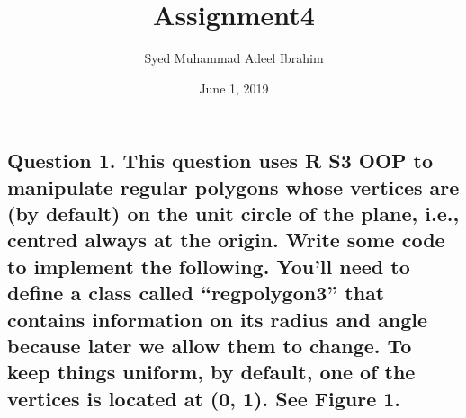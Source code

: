 \documentclass[]{article}
\title{Assignment4}
\author{Syed Muhammad Adeel Ibrahim}
\date{June 1, 2019}
\begin{document}
\maketitle

\subsection{\texorpdfstring{Question 1. This question uses R S3 OOP to
manipulate regular polygons whose vertices are (by default) on the unit
circle of the plane, i.e., centred always at the origin. Write some code
to implement the following. You'll need to define a class called
``regpolygon3'' that contains information on its radius and angle
because later we allow them to change. To keep things uniform, by
default, one of the vertices is located at (0, 1). See Figure
1.}{Question 1. This question uses R S3 OOP to manipulate regular polygons whose vertices are (by default) on the unit circle of the plane, i.e., centred always at the origin. Write some code to implement the following. You'll need to define a class called regpolygon3 that contains information on its radius and angle because later we allow them to change. To keep things uniform, by default, one of the vertices is located at (0, 1). See Figure 1.}}\label{question-1.-this-question-uses-r-s3-oop-to-manipulate-regular-polygons-whose-vertices-are-by-default-on-the-unit-circle-of-the-plane-i.e.-centred-always-at-the-origin.-write-some-code-to-implement-the-following.-youll-need-to-define-a-class-called-regpolygon3-that-contains-information-on-its-radius-and-angle-because-later-we-allow-them-to-change.-to-keep-things-uniform-by-default-one-of-the-vertices-is-located-at-0-1.-see-figure-1.}
\end{document}
